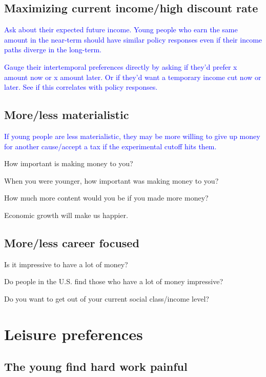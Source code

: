 \documentclass[12pt]{article}
\newcommand{\blue}[1]{\textcolor{blue}{#1}}
\begin{document}
    \subsection{Maximizing current income/high discount rate}

    \blue{Ask about their expected future income. Young people who earn the same amount in the near-term should have similar policy responses even if their income paths diverge in the long-term.}

    \blue{Gauge their intertemporal preferences directly by asking if they'd prefer x amount now or x amount later. Or if they'd want a temporary income cut now or later. See if this correlates with policy responses.}
    
    \subsection{More/less materialistic}

    \blue{If young people are less materialistic, they may be more willing to give up money for another cause/accept a tax if the experimental cutoff hits them.}

    How important is making money to you?

    When you were younger, how important was making money to you?

    How much more content would you be if you made more money?

    Economic growth will make us happier.

    \subsection{More/less career focused}
    
    Is it impressive to have a lot of money?
    
    Do people in the U.S. find those who have a lot of money impressive?

    Do you want to get out of your current social class/income level?

\section{Leisure preferences}

    \subsection{The young find hard work painful}
\end{document}
